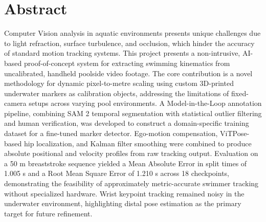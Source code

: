 \chapter*{Abstract}

Computer Vision analysis in aquatic environments presents unique challenges due to light refraction, surface turbulence, and occlusion, which hinder the accuracy of standard motion tracking systems. This project presents a non-intrusive, AI-based proof-of-concept system for extracting swimming kinematics from uncalibrated, handheld poolside video footage. The core contribution is a novel methodology for dynamic pixel-to-metre scaling using custom 3D-printed underwater markers as calibration objects, addressing the limitations of fixed-camera setups across varying pool environments. A Model-in-the-Loop annotation pipeline, combining SAM 2 temporal segmentation with statistical outlier filtering and human verification, was developed to construct a domain-specific training dataset for a fine-tuned marker detector. Ego-motion compensation, ViTPose-based hip localization, and Kalman filter smoothing were combined to produce absolute positional and velocity profiles from raw tracking output. Evaluation on a 50 m breaststroke sequence yielded a Mean Absolute Error in split times of 1.005 s and a Root Mean Square Error of 1.210 s across 18 checkpoints, demonstrating the feasibility of approximately metric-accurate swimmer tracking without specialized hardware. Wrist keypoint tracking remained noisy in the underwater environment, highlighting distal pose estimation as the primary target for future refinement.